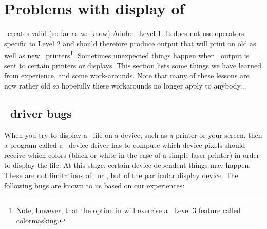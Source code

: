 %
%
\chapter{Problems with display of \gmt\ \PS}
\label{app:H}
\thispagestyle{headings}

\GMT\ creates valid (so far as we know) Adobe \PS\
Level 1.  It does not use operators specific to Level 2 and
should therefore produce output that will print on old as well
as new \PS\ printers\footnote{Note, however, that the  option in 
will exercise a \PS\ Level 3 feature called colormasking.}.  Sometimes unexpected things
happen when \GMT\ output is sent to certain printers or displays.
This section lists some things we have learned from experience,
and some work-arounds.  Note that many of these lessons are now rather old so hopefully
these workarounds no longer apply to anybody...

\section{\PS\ driver bugs}

When you try to display a \PS\ file on a device,
such as a printer or your screen, then a program called a
\PS\ device driver has to compute which device
pixels should receive which colors (black or white in the case
of a simple laser printer) in order to display the file.  At
this stage, certain device-dependent things may happen.  These
are not limitations of \GMT\ or \PS, but of the
particular display device.  The following bugs are known to us
based on our experiences:

